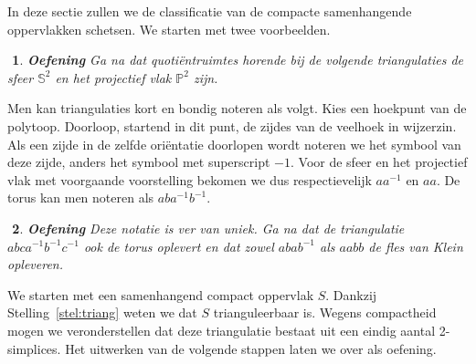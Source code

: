 \documentclass[12pt]{book}
\newtheorem{eoef}{$\!\!$}[chapter]
\newenvironment{oef}{\begin{eoef} {\bf Oefening}}{\end{eoef}}
\begin{document}
In deze sectie zullen we de classificatie van de compacte samenhangende oppervlakken schetsen. We starten met twee voorbeelden.


\begin{oef}
Ga na dat quoti\"entruimtes horende bij de volgende triangulaties de sfeer $\mathbb{S}^2$ en het projectief vlak $\mathbb{P}^2$ zijn.

\begin{center}
\hspace{2cm}
\end{center}
\end{oef}

Men kan triangulaties kort en bondig noteren als volgt. Kies een hoekpunt van de polytoop. Doorloop, startend in dit punt, de zijdes van de veelhoek in wijzerzin. Als een zijde in de zelfde ori\"entatie doorlopen wordt noteren we het symbool van deze zijde, anders het symbool met superscript $-1$. Voor de sfeer en het projectief vlak met voorgaande voorstelling bekomen we dus respectievelijk $aa^{-1}$ en $aa$. De torus kan men noteren als $aba^{-1}b^{-1}$.

\begin{oef}
Deze notatie is ver van uniek. Ga na dat de triangulatie $abc a^{-1}b^{-1}c^{-1}$ ook de torus oplevert en dat zowel $abab^{-1}$ als $aabb$ de fles van Klein opleveren.
\end{oef}




We starten met een samenhangend compact oppervlak $S$. Dankzij Stelling~\ref{stel:triang} weten we dat $S$ trianguleerbaar is. Wegens compactheid mogen we veronderstellen dat deze triangulatie bestaat uit een eindig aantal 2-simplices. Het uitwerken van de volgende stappen laten we over als oefening.
\end{document}
